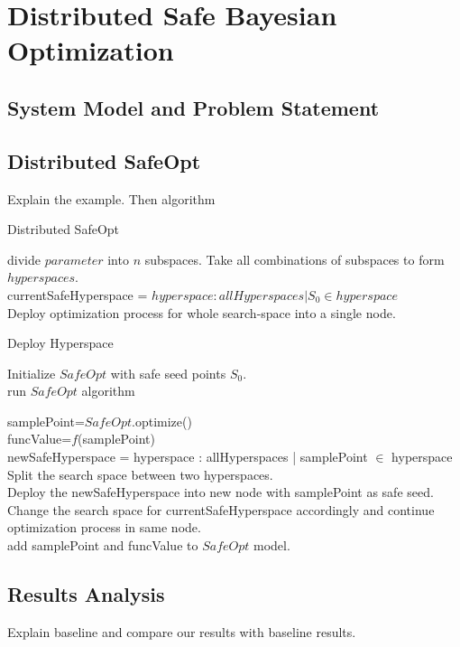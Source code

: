 \chapter{Distributed Safe Bayesian Optimization}
\label{ch:distbo}

\section{System Model and Problem Statement}

\section{Distributed SafeOpt}
Explain the example.
Then algorithm

\begin{algorithm}
	\caption{Distributed SafeOpt}
	{
		divide $parameter$ into $n$ subspaces.
	}
	Take all combinations of subspaces to form $hyperspaces$.\\
	currentSafeHyperspace = $hyperspace : allHyperspaces | S_0 \in hyperspace$\\
	Deploy optimization process for whole search-space into a single node.
\end{algorithm}

\begin{algorithm}
	\SetAlgoVlined
	\caption{Deploy Hyperspace}
	Initialize $SafeOpt$ with safe seed points $S_0$.\\
	{
		{
			run $SafeOpt$ algorithm
		}
		\KwRet{}
	}
	{
		samplePoint=$SafeOpt$.optimize()\\
		funcValue=$f$(samplePoint)\\
		newSafeHyperspace = hyperspace : allHyperspaces | samplePoint $\in$ hyperspace\\
		{
			Split the search space between two hyperspaces.\\
			Deploy the newSafeHyperspace into new node with samplePoint as safe seed.\\
			Change the search space for currentSafeHyperspace accordingly and continue optimization process in same node.\\
		}
		{
			add samplePoint and funcValue to $SafeOpt$ model.
		}
		
	}
\end{algorithm}

\section{Results Analysis}
Explain baseline and compare our results with baseline results.
